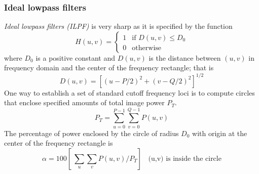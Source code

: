 \subsubsection{Ideal lowpass filters}
\emph{Ideal lowpass filters (ILPF)} is very sharp as it is specified by the function 
\begin{equation}
H(u,v) = \left \{ \begin{array}{rcl}
1 & \text{if $D(u,v)\leq D_0$} \\
0 & \text{otherwise}
\end{array} \right.
\end{equation}
where $D_0$ is a positive constant and $D(u,v)$ is the distance between  $(u,v)$ in frequency domain and the center of the frequency rectangle; that is \begin{equation} D(u,v) = \left[ (u-P/2)^2+(v-Q/2)^2 \right]^{1/2} \end{equation} 
One way to establish a set of standard cutoff frequency loci is to compute circles that enclose specified amounts of total image power $P_T$. \begin{equation} P_T=\sum_{u=0}^{P-1}\sum_{v=0}^{Q-1}P(u,v) \end{equation}
The percentage of power enclosed by the circle of radius $D_0$ with origin at the center of the frequency rectangle is \begin{equation} \alpha=100\left[\ \sum_u\sum_vP(u,v)/P_T \right] ~~~~ \text{(u,v) is inside the circle}\end{equation}
